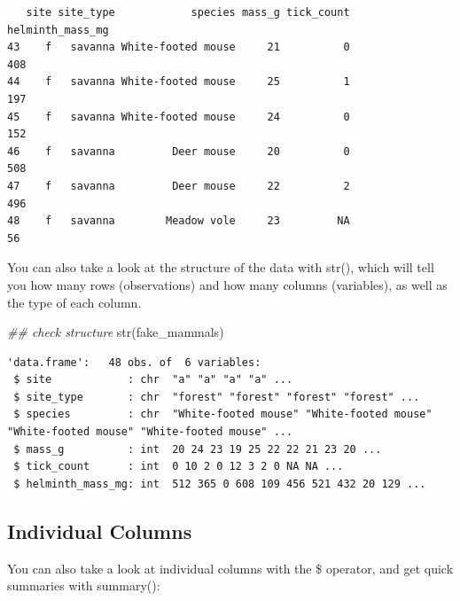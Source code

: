 \documentclass[
  letterpaper,
  DIV=11,
  numbers=noendperiod]{scrreprt}
\newenvironment{Shaded}{\begin{snugshade}}{\end{snugshade}}
\newcommand{\DocumentationTok}[1]{\textcolor[rgb]{0.37,0.37,0.37}{\textit{#1}}}
\newcommand{\FunctionTok}[1]{\textcolor[rgb]{0.28,0.35,0.67}{#1}}
\newcommand{\NormalTok}[1]{\textcolor[rgb]{0.00,0.23,0.31}{#1}}
\newcommand{\SpecialCharTok}[1]{\textcolor[rgb]{0.37,0.37,0.37}{#1}}
\begin{document}
\begin{verbatim}
   site site_type            species mass_g tick_count helminth_mass_mg
43    f   savanna White-footed mouse     21          0              408
44    f   savanna White-footed mouse     25          1              197
45    f   savanna White-footed mouse     24          0              152
46    f   savanna         Deer mouse     20          0              508
47    f   savanna         Deer mouse     22          2              496
48    f   savanna        Meadow vole     23         NA               56
\end{verbatim}

You can also take a look at the structure of the data with str(), which
will tell you how many rows (observations) and how many columns
(variables), as well as the type of each column.

\begin{Shaded}
\begin{Highlighting}[]
\DocumentationTok{\#\# check structure}
\FunctionTok{str}\NormalTok{(fake\_mammals)}
\end{Highlighting}
\end{Shaded}

\begin{verbatim}
'data.frame':   48 obs. of  6 variables:
 $ site            : chr  "a" "a" "a" "a" ...
 $ site_type       : chr  "forest" "forest" "forest" "forest" ...
 $ species         : chr  "White-footed mouse" "White-footed mouse" "White-footed mouse" "White-footed mouse" ...
 $ mass_g          : int  20 24 23 19 25 22 22 21 23 20 ...
 $ tick_count      : int  0 10 2 0 12 3 2 0 NA NA ...
 $ helminth_mass_mg: int  512 365 0 608 109 456 521 432 20 129 ...
\end{verbatim}

\hypertarget{individual-columns}{%
\subsection{Individual Columns}\label{individual-columns}}

You can also take a look at individual columns with the \$ operator, and
get quick summaries with summary():

\begin{Shaded}
\end{Shaded}
\end{document}
